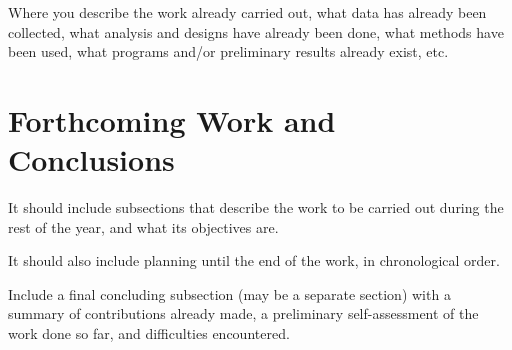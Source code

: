 \documentclass[sigplan]{acmart}
\begin{document}
Where you describe the work already carried out, what data has already been collected, what analysis and designs have already been done, what methods have been used, what programs and/or preliminary results already exist, etc.

\section{Forthcoming Work and Conclusions} \label{sec:conclusions}
It should include subsections that describe the work to be carried out during the rest of the year, and what its objectives are.

It should also include planning until the end of the work, in chronological order.

Include a final concluding subsection (may be a separate section) with a summary of contributions already made, a preliminary self-assessment of the work done so far, and difficulties encountered.




\end{document}
